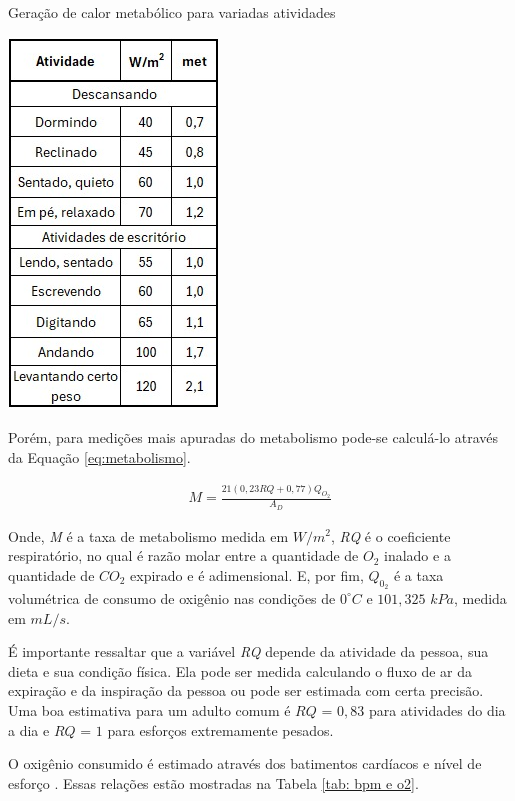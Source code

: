 \documentclass[acronym,symbols,table]{fei}
\begin{document}
\begin{table}[!htb] 
 \centering
    \caption{Geração de calor metabólico para variadas atividades}
    \includegraphics[width=0.4\linewidth]{Tabelas/tabela-met1.jpeg}
    \label{tab: metabolismo}
\end{table}

Porém, para medições mais apuradas do metabolismo pode-se calculá-lo através da Equação \ref{eq:metabolismo}.

\begin{equation} \label{eq:metabolismo}
    \begin{aligned}
   M = \frac{21(0,23RQ + 0,77)Q_{{O_{2}}}}{A_{D}}
    \end{aligned}
\end{equation}

Onde, \textit{M} é a taxa de metabolismo medida em $W/m^2$, \textit{RQ} é o coeficiente respiratório, no qual é razão molar entre a quantidade de ${O}_{2}$ inalado e a quantidade de ${CO}_{2}$ expirado e é adimensional. E, por fim, $Q_{0_{2}}$ é a taxa volumétrica de consumo de oxigênio nas condições de $0^\circ C$ e $101,325$ $kPa$, medida em $mL/s$.

É importante ressaltar que a variável \textit{RQ} depende da atividade da pessoa, sua dieta e sua condição física. Ela pode ser medida calculando o fluxo de ar da expiração e da inspiração da pessoa ou pode ser estimada com certa precisão. Uma boa estimativa para um adulto comum é $RQ$ = $0,83$ para atividades do dia a dia e $RQ$ = $1$ para esforços extremamente pesados.

O oxigênio consumido é estimado através dos batimentos cardíacos e nível de esforço \cite{aastrand2003textbook}. Essas relações estão mostradas na Tabela \ref{tab: bpm e o2}.
\end{document}
